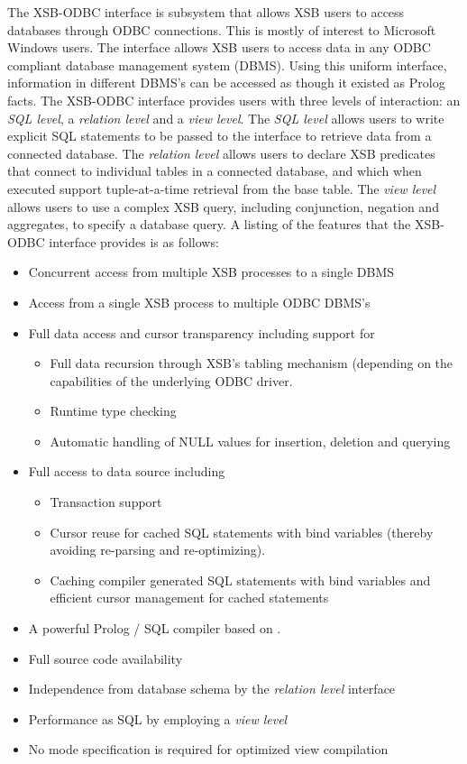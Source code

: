 The XSB-ODBC interface is subsystem that allows XSB users to access
databases through ODBC connections.  This is mostly of interest to
Microsoft Windows users.  The interface allows XSB users to access
data in any ODBC compliant database management system (DBMS). Using
this uniform interface, information in different DBMS's can be
accessed as though it existed as Prolog facts. The XSB-ODBC interface
provides users with three levels of interaction: an {\it SQL level}, a
{\it relation level} and a {\it view level}.  The {\it SQL level}
allows users to write explicit SQL statements to be passed to the
interface to retrieve data from a connected database.  The {\it
relation level} allows users to declare XSB predicates that connect to
individual tables in a connected database, and which when executed
support tuple-at-a-time retrieval from the base table.  The {\it view
level} allows users to use a complex XSB query, including conjunction,
negation and aggregates, to specify a database query.  A listing of
the features that the XSB-ODBC interface provides is as follows:
\begin{itemize} 
\item Concurrent access from multiple XSB processes to a single DBMS
\item Access from a single XSB process to multiple ODBC DBMS's
\item Full data access and cursor transparency including support for
        \begin{itemize}
        \item Full data recursion through XSB's tabling mechanism 
        (depending on the capabilities of the underlying ODBC driver.
        \item Runtime type checking
        \item Automatic handling of NULL values for insertion, 
                deletion and querying
        \end{itemize}
\item Full access to data source including
        \begin{itemize}
        \item Transaction support
        \item Cursor reuse for cached SQL statements 
                with bind variables (thereby avoiding re-parsing and 
                re-optimizing).
        \item Caching compiler generated SQL statements with bind variables 
                and efficient cursor management for cached statements
        \end{itemize}
\item A powerful Prolog / SQL compiler based on \cite{Drax92}.
\item Full source code availability
\item Independence from database schema by the {\it relation level} interface
\item Performance as SQL by employing a {\it view level} 
\item No mode specification is required for optimized view compilation
\end{itemize}

